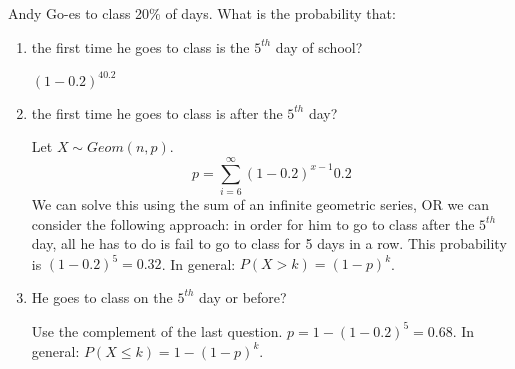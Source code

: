 \question Andy Go-es to class 20\% of days. What is the probability that:
\begin{enumerate}[label=(\alph*)]
    \item the first time he goes to class is the $5^{th}$ day of school? 
    \begin{solution} [.5 cm]
    $(1-0.2)^40.2$
    \end{solution}
    \item the first time he goes to class is after the $5^{th}$ day?
    \begin{solution} [.5 cm]
    Let $X \sim Geom(n,p)$. \[ p = \sum_{i = 6}^{\infty} (1-0.2)^{x-1}0.2\] We can solve this using the sum of an infinite geometric series, OR we can consider the following approach: in order for him to go to class after the $5^{th}$ day, all he has to do is fail to go to class for 5 days in a row. This probability is $(1-0.2)^5 = 0.32$. In general: $P(X>k) = (1-p)^k$.
    \end{solution}
    \item He goes to class on the $5^{th}$ day or before? 
    \begin{solution} [.5 cm]
    Use the complement of the last question. $p = 1-(1-0.2)^5 = 0.68$. In general: $P(X\leq k) = 1-(1-p)^k$. 
    \end{solution}
\end{enumerate}